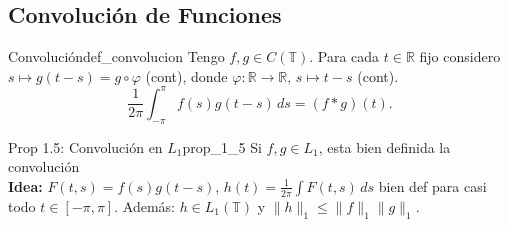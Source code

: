 \subsection{Convolución de Funciones}

\begin{definicion}{Convolución}{def_convolucion}
Tengo $f, g \in C(\mathbb{T})$. Para cada $t \in \mathbb{R}$ fijo considero $s \mapsto g(t - s) = g \circ \varphi$ (cont), donde $\varphi: \mathbb{R} \to \mathbb{R}$, $s \mapsto t - s$ (cont).
\[
\frac{1}{2\pi} \int_{-\pi}^\pi f(s) g(t - s) \, ds = (f * g)(t).
\]
\end{definicion}

\begin{proposicion}{Prop 1.5: Convolución en $L_1$}{prop_1_5}
Si $f, g \in L_1$, esta bien definida la convolución \\
\textbf{Idea:} $F(t, s) = f(s) g(t - s)$, $h(t) = \frac{1}{2\pi} \int F(t, s) \, ds$ bien def para casi todo $t \in [-\pi, \pi]$. Además: $h \in L_1(\mathbb{T})$ y $\|h\|_1 \le \|f\|_1 \|g\|_1$.
\end{proposicion}

